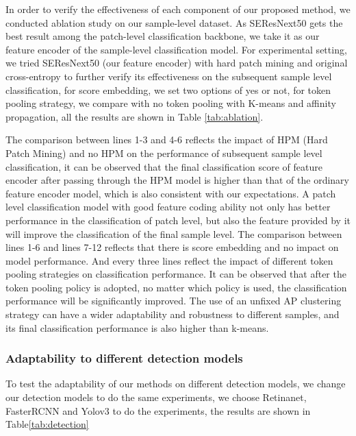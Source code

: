 In order to verify the effectiveness of each component of our proposed method, we conducted ablation study on our sample-level dataset. As SEResNext50 gets the best result among the patch-level classification backbone, we take it as our feature encoder of the sample-level classification model. For experimental setting, we tried SEResNext50 (our feature encoder) with hard patch mining and original cross-entropy to further verify its effectiveness on the subsequent sample level classification, for score embedding, we set two options of yes or not, for token pooling strategy, we compare with no token pooling with K-means and affinity propagation, all the results are shown in Table \ref{tab:ablation}.
\par
The comparison between lines 1-3 and 4-6 reflects the impact of HPM (Hard Patch Mining) and no HPM on the performance of subsequent sample level classification, it can be observed that the final classification score of feature encoder after passing through the HPM model is higher than that of the ordinary feature encoder model, which is also consistent with our expectations. A patch level classification model with good feature coding ability not only has better performance in the classification of patch level, but also the feature provided by it will improve the classification of the final sample level. 
The comparison between lines 1-6 and lines 7-12 reflects that there is score embedding and no impact on model performance.
And every three lines reflect the impact of different token pooling strategies on classification performance. It can be observed that after the token pooling policy is adopted, no matter which policy is used, the classification performance will be significantly improved. The use of an unfixed AP clustering strategy can have a wider adaptability and robustness to different samples, and its final classification performance is also higher than k-means.
\subsubsection{Adaptability to different detection models}
To test the adaptability of our methods on different detection models, we change our detection models to do the same experiments, we choose Retinanet, FasterRCNN and Yolov3 to do the experiments, the results are shown in Table\ref{tab:detection}


